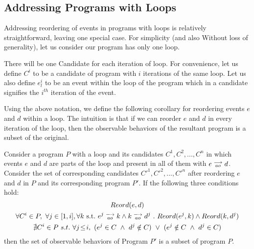\subsection{Addressing Programs with Loops}
        
        Addressing reordering of events in programs with loops is relatively straightforward, leaving one special case. 
        For simplicity (and also Without loss of generality), let us consider our program has only one loop.

        There will be one Candidate for each iteration of loop. For convenience, let us define $C^i$ to be a candidate of program with $i$ iterations of the same loop. Let us also define $e_l^i$ to be an event within the loop of the program which in a candidate signifies the $i^{th}$ iteration of the event. 

        Using the above notation, we define the following corollary for reordering events $e$ and $d$ within a loop.
        The intuition is that if we can reorder $e$ and $d$ in every iteration of the loop, then the observable behaviors of the resultant program is a subset of the original. 
        
        \begin{corollary}
            Consider a program $P$ with a loop and its candidates $C^1, C^2, ... , C^n$ in which events $e$ and $d$ are parts of the loop and present in all of them with $e\stackrel{\longrightarrow}{_{ao}}d$. Consider the set of corresponding candidates $C'^1, C'^2, ... , C'^n$ after reordering $e$ and $d$ in $P$ and its corresponding program $P'$. If the following three conditions hold:
            \begin{gather*}
                Reord(e, d) \\ 
                \forall C^i \in P , \ \forall j \in [1,i], \forall k \ \text{s.t.} \ \reln{e^j}{ao}{k} \wedge \reln{k}{ao}{d^j} \ . \ Reord(e^j, k) \wedge Reord(k, d^j)  \\ 
                \nexists C^i \in P \ s.t. \ 
                    \forall j\!\leq\!i , \ (e^j \in C \ \wedge \ d^j \notin C) \ \vee \ 
                    (e^j \notin C \ \wedge \ d^j \in C) 
            \end{gather*}
            then the set of observable behaviors of Program $P'$ is a subset of program $P$.     
        \end{corollary}

